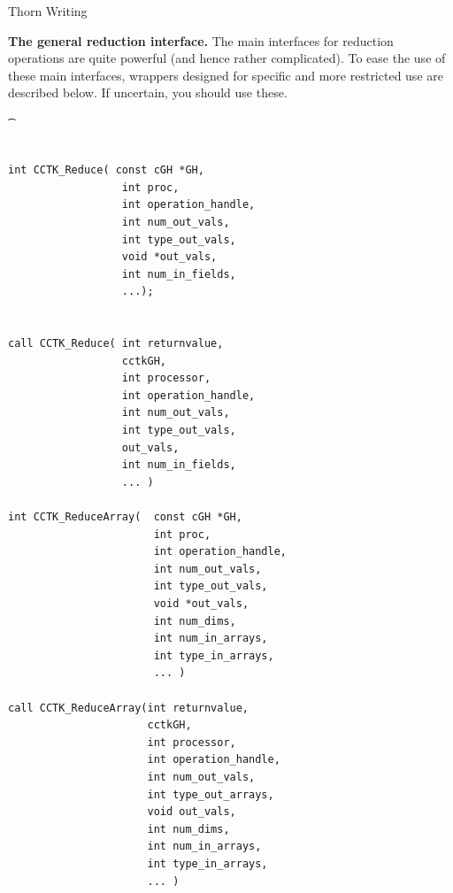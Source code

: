 \begin{cactuspart}{Thorn Writing}
\vskip 0.25cm


{\bf The general reduction interface.}
The main interfaces for reduction operations are quite powerful (and
hence rather complicated). To ease the use of these main interfaces, wrappers
designed for specific and more restricted use are described below. If 
uncertain, you should use these.

{\t
\begin{verbatim}

int CCTK_Reduce( const cGH *GH, 
                  int proc,
                  int operation_handle,
                  int num_out_vals,
                  int type_out_vals,
                  void *out_vals,
                  int num_in_fields,
                  ...);


call CCTK_Reduce( int returnvalue, 
                  cctkGH, 
                  int processor,
                  int operation_handle,
                  int num_out_vals,
                  int type_out_vals,
                  out_vals,
                  int num_in_fields,
                  ... )

int CCTK_ReduceArray(  const cGH *GH,
                       int proc,
                       int operation_handle,
                       int num_out_vals,
                       int type_out_vals,
                       void *out_vals,
                       int num_dims,
                       int num_in_arrays,
                       int type_in_arrays,
                       ... )

call CCTK_ReduceArray(int returnvalue,
                      cctkGH,
                      int processor,
                      int operation_handle,
                      int num_out_vals,
                      int type_out_arrays,
                      void out_vals,
                      int num_dims,
                      int num_in_arrays,
                      int type_in_arrays,
                      ... )
\end{verbatim}
}


\end{cactuspart}
